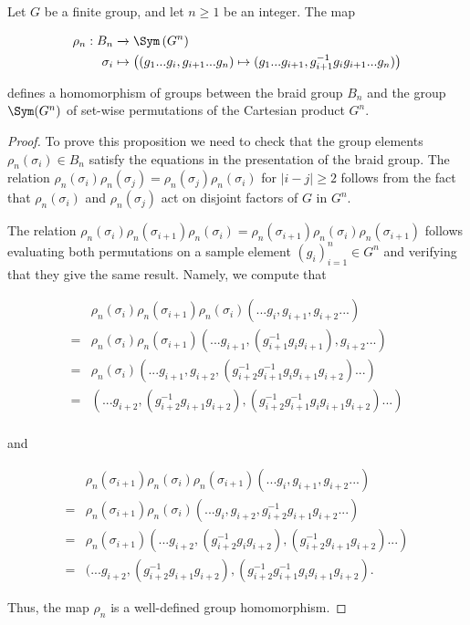\begin{prop} Let $G$ be a finite group, and let $n\geq 1$ be an integer. The map

\begin{align*}
\rho_n: B_n &\xrightarrow{} \Sym\left(G^n\right)\\
\sigma_i &\mapsto \left((g_1... g_i, g_{i+1} ... g_n)\mapsto (g_1... g_{i+1}, g_{i+1}^{-1}g_i g_{i+1} ... g_n) \right)
\end{align*}

defines a homomorphism of groups between the braid group $B_n$ and the group $\Sym(G^n)$ of set-wise permutations of the Cartesian product $G^n$.
\end{prop}
\begin{proof} To prove this proposition we need to check that the group elements $\rho_n(\sigma_i)\in B_n$ satisfy the equations in the presentation of the braid group. The relation $\rho_n(\sigma_i)\rho_n(\sigma_j)=\rho_n(\sigma_j)\rho_n(\sigma_i)$ for $|i-j|\geq 2$ follows from the fact that $\rho_n(\sigma_i)$ and $\rho_n(\sigma_j)$ act on disjoint factors of $G$ in $G^n$.

The relation $\rho_n(\sigma_i)\rho_n(\sigma_{i+1})\rho_n(\sigma_i)=\rho_n(\sigma_{i+1})\rho_n(\sigma_i)\rho_n(\sigma_{i+1})$ follows evaluating both permutations on a sample element $(g_{i})_{i=1}^{n}\in G^n$ and verifying that they give the same result. Namely, we compute that

\begin{align*}
&\rho_n(\sigma_i)\rho_n(\sigma_{i+1})\rho_n(\sigma_i)(... g_{i}, g_{i+1},g_{i+2}...)\\
=&\rho_n(\sigma_i)\rho_n(\sigma_{i+1})(... g_{i+1}, (g_{i+1}^{-1}g_{i}g_{i+1}),g_{i+2}...)\\
=&\rho_n(\sigma_i)(... g_{i+1},g_{i+2}, (g_{i+2}^{-1}g_{i+1}^{-1}g_{i}g_{i+1}g_{i+2})...)\\
=&(... g_{i+2},(g_{i+2}^{-1}g_{i+1}g_{i+2}), (g_{i+2}^{-1}g_{i+1}^{-1}g_{i}g_{i+1}g_{i+2})...)\\
\end{align*}

and 

\begin{align*}
&\rho_n(\sigma_{i+1})\rho_n(\sigma_{i})\rho_n(\sigma_{i+1})(... g_{i}, g_{i+1},g_{i+2}...)\\
=&\rho_n(\sigma_{i+1})\rho_n(\sigma_{i})(... g_{i}, g_{i+2},g_{i+2}^{-1}g_{i+1}g_{i+2}...)\\
=&\rho_n(\sigma_{i+1})(... g_{i+2}, (g_{i+2}^{-1}g_{i}g_{i+2}),(g_{i+2}^{-1}g_{i+1}g_{i+2})...)\\
=&(... g_{i+2}, (g_{i+2}^{-1}g_{i+1}g_{i+2}), (g_{i+2}^{-1}g^{-1}_{i+1}g_{i}g_{i+1}g_{i+2}).
\end{align*}

Thus, the map $\rho_n$ is a well-defined group homomorphism.
\end{proof}

